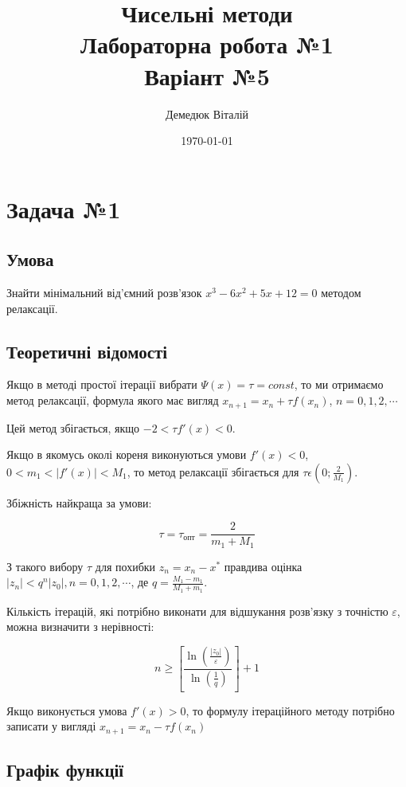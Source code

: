 \documentclass[a4paper, 12pt]{article}
\author{Демедюк Віталій}
\title{Чисельні методи\\
	   Лабораторна робота №1\\
	   Варіант №5}
\date{\today}
\begin{document}
\maketitle

\newpage
\tableofcontents

\newpage
\section{Задача №1}

\subsection{Умова}

Знайти мінімальний від’ємний розв’язок $ x^3 - 6x^2 + 5x + 12 = 0 $
методом релаксації.

\subsection{Теоретичні відомості}

	Якщо в методі простої ітерації вибрати $\Psi(x) = \tau = const$, то ми отримаємо метод релаксації, формула якого має вигляд $x_{n+1} = x_n + \tau f(x_n)$, $n = 0, 1, 2, \cdots$

Цей метод збігається, якщо $-2 < \tau f'(x) < 0$.

Якщо в якомусь околі кореня виконуються умови $f'(x)<0$,\\ $0<m_1<|f'(x)|<M_1$, то метод релаксації збігається для $\tau \epsilon \left( 0; \frac{2}{M_1}{} \right)$.

Збіжність найкраща за умови:

\[ \tau = \tau_{\text{опт}} = \frac{2}{m_1 + M_1} \]

З такого вибору $\tau$ для похибки $z_n = x_n - x^*$ правдива оцінка \\
$|z_n|<q^n|z_0|, n = 0, 1, 2, \cdots$, де $q = \frac{M_1-m_1}{M_1+m_1}$.

Кількість ітерацій, які потрібно виконати для відшукання розв'язку з точністю $\varepsilon$, можна визначити з нерівності:

\[ n \geqslant \left[ \frac{\ln \left( \frac{|z_0|}{\varepsilon} \right) }{\ln \left( \frac{1}{q}  \right)} \right] + 1 \]

Якщо виконується умова $f'(x)>0$, то формулу ітераційного методу потрібно записати у вигляді $x_{n+1} = x_n - \tau f(x_n)$


\subsection{Графік функції}
\end{document}
